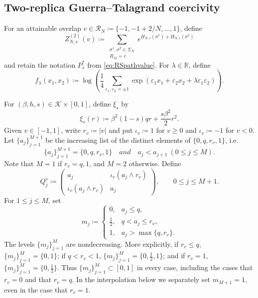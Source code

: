 \documentclass[11pt]{article}
\numberwithin{equation}{section}
\newcommand{\R}{\mathbb{R}}
\newcommand{\1}{\mathbf 1}
\newcommand{\cK}{\mathcal K}
\begin{document}
\subsection{Two-replica Guerra--Talagrand coercivity}\label{subsec:GT}

For an attainable overlap $v\in\mathcal R_N
\coloneqq\{-1,-1+2/N,\ldots,1\}$, define
\begin{equation}
 Z^{(2)}_{N,s}(v)
 \coloneqq
 \sum_{\substack{\sigma^1,\sigma^2\in\Sigma_N\\R_{12}=v}}
 e^{H_{N,s}(\sigma^1)+H_{N,s}(\sigma^2)}
 \label{eq:constrainedZ}
\end{equation}
and retain the notation $P_s^*$ from \eqref{eq:RSpathvalue}.  For
$\lambda\in\mathbb R$, define
\begin{equation}
 f_\lambda(x_1,x_2)
 \coloneqq\log\left(\frac14\sum_{\varepsilon_1,\varepsilon_2=\pm1}
 \exp(\varepsilon_1x_1+\varepsilon_2x_2
       +\lambda\varepsilon_1\varepsilon_2)\right).
 \label{eq:GTterminal}
\end{equation}

For $(\beta,h,s)\in\cK\times[0,1]$, define $\xi_s$ by
\begin{equation}
 \xi_s(r)\coloneqq\beta^2(1-s)qr+\frac{s\beta^2}{2}r^2.
\label{eq:xi}
\end{equation}
Given $v\in[-1,1]$, write
$r_v\coloneqq|v|$ and put $\iota_v\coloneqq1$ for $v\ge0$ and
$\iota_v\coloneqq-1$ for $v<0$.  Let $\{ a_j \}_{j=1}^{M+1}$ be the increasing list of the distinct elements of $\{0,q,r_v,1\}$, i.e.
\[
\{ a_j \}_{j=1}^{M+1}= \{0,q,r_v,1\} \quad and \quad a_j< a_{j+1} \ (0\le j \le M).
\]
Note that $M=1$ if $r_v =q,1$, and $M=2$ otherwise.
Define
\begin{equation}
 Q_j^v\coloneqq
 \begin{pmatrix}
 a_j&\iota_v(a_j\wedge r_v)\\
 \iota_v(a_j\wedge r_v)&a_j
 \end{pmatrix},
 \qquad 0\le j\le M+1.
\end{equation}
For $1\le j\le M$, set
\begin{equation}
 m_j\coloneqq
 \begin{cases}
 0,&a_j\le q,\\[1mm]
 \frac12,&q<a_j\le r_v,\\[1mm]
 1,&a_j>\max\{q,r_v\}.
 \end{cases}
\end{equation}
The levels $\{ m_j\} _{j=1}^{M}$ are nondecreasing.  More explicitly, if $r_v\le q$, $\{ m_j\} _{j=1}^{M} = \{ 0,1\}$; if $q<r_v<1$, $\{ m_j\} _{j=1}^{M} = \{ 0,\frac12,1\}$; and if $r_v=1$, $\{ m_j\} _{j=1}^{M} = \{ 0,\frac12\}$.  Thus
$\{ m_j\} _{j=1}^{M} \subset [0,1]$ in every case, including
the cases that $r_v=0$ and that $r_v=q$.  In the interpolation below we separately set
$m_{M+1}=1$, even in the case that $r_v=1$.
\end{document}
